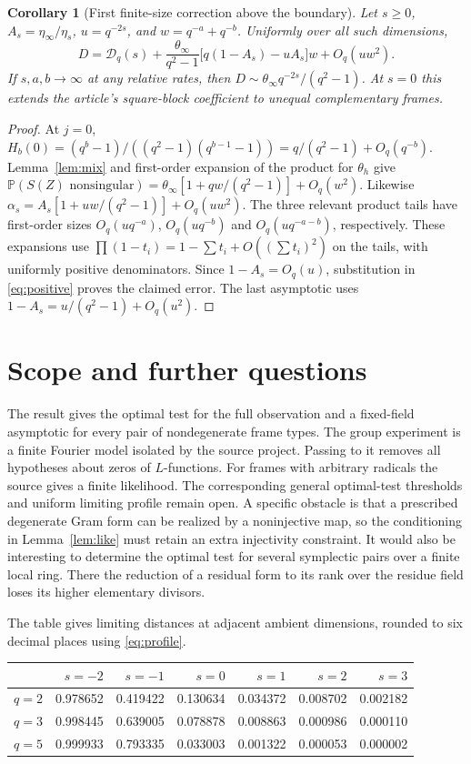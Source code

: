 \documentclass[11pt]{article}
\newtheorem{corollary}[theorem]{Corollary}
\newcommand{\Prob}{\mathbb P}
\begin{document}
\begin{corollary}[First finite-size correction above the boundary]\label{cor:first}
Let $s\ge0$, $A_s=\eta_\infty/\eta_s$, $u=q^{-2s}$, and $w=q^{-a}+q^{-b}$. Uniformly over all such dimensions,
\[
 D=\mathcal D_q(s)+\frac{\theta_\infty}{q^2-1}\bigl[q(1-A_s)-uA_s\bigr]w+O_q(uw^2).
\]
If $s,a,b\to\infty$ at any relative rates, then $D\sim \theta_\infty q^{-2s}/(q^2-1)$. At $s=0$ this extends the article's square-block coefficient to unequal complementary frames.
\end{corollary}
\begin{proof}
At $j=0$, $H_b(0)=(q^b-1)/((q^2-1)(q^{b-1}-1))=q/(q^2-1)+O_q(q^{-b})$. Lemma~\ref{lem:mix} and first-order expansion of the product for $\theta_h$ give
$\Prob(S(Z)\text{ nonsingular})=\theta_\infty[1+qw/(q^2-1)]+O_q(w^2)$. Likewise $\alpha_s=A_s[1+uw/(q^2-1)]+O_q(uw^2)$. The three relevant product tails have first-order sizes $O_q(uq^{-a})$, $O_q(uq^{-b})$ and $O_q(uq^{-a-b})$, respectively. These expansions use $\prod(1-t_i)=1-\sum t_i+O((\sum t_i)^2)$ on the tails, with uniformly positive denominators. Since $1-A_s=O_q(u)$, substitution in \eqref{eq:positive} proves the claimed error. The last asymptotic uses $1-A_s=u/(q^2-1)+O_q(u^2)$.
\end{proof}

\section{Scope and further questions}

The result gives the optimal test for the full observation and a fixed-field asymptotic for every pair of nondegenerate frame types. The group experiment is a finite Fourier model isolated by the source project. Passing to it removes all hypotheses about zeros of $L$-functions. For frames with arbitrary radicals the source gives a finite likelihood. The corresponding general optimal-test thresholds and uniform limiting profile remain open. A specific obstacle is that a prescribed degenerate Gram form can be realized by a noninjective map, so the conditioning in Lemma~\ref{lem:like} must retain an extra injectivity constraint. It would also be interesting to determine the optimal test for several symplectic pairs over a finite local ring. There the reduction of a residual form to its rank over the residue field loses its higher elementary divisors.

The table gives limiting distances at adjacent ambient dimensions, rounded to six decimal places using \eqref{eq:profile}.
\begin{center}\small
\begin{tabular}{lrrrrrr}
\toprule & $s=-2$ & $s=-1$ & $s=0$ & $s=1$ & $s=2$ & $s=3$\\
\midrule
$q=2$ & 0.978652 & 0.419422 & 0.130634 & 0.034372 & 0.008702 & 0.002182\\
$q=3$ & 0.998445 & 0.639005 & 0.078878 & 0.008863 & 0.000986 & 0.000110\\
$q=5$ & 0.999933 & 0.793335 & 0.033003 & 0.001322 & 0.000053 & 0.000002\\
\bottomrule
\end{tabular}
\end{center}
\end{document}

